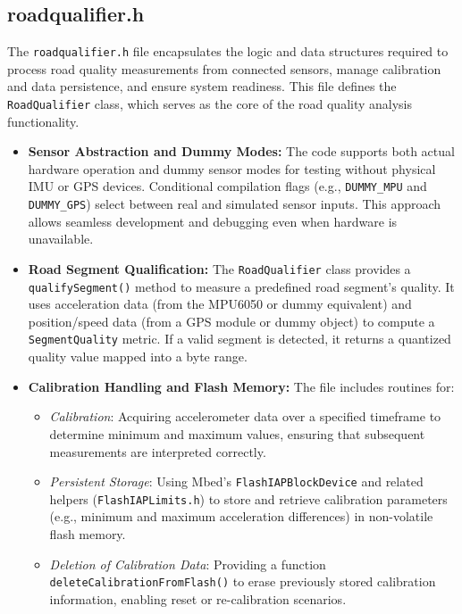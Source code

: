 \subsection{roadqualifier.h}

The \texttt{roadqualifier.h} file encapsulates the logic and data structures required to process road quality measurements from connected sensors, manage calibration and data persistence, and ensure system readiness. This file defines the \texttt{RoadQualifier} class, which serves as the core of the road quality analysis functionality.

\begin{itemize}
    \item \textbf{Sensor Abstraction and Dummy Modes:}  
    The code supports both actual hardware operation and dummy sensor modes for testing without physical IMU or GPS devices. Conditional compilation flags (e.g., \texttt{DUMMY\_MPU} and \texttt{DUMMY\_GPS}) select between real and simulated sensor inputs. This approach allows seamless development and debugging even when hardware is unavailable.

    \item \textbf{Road Segment Qualification:}  
    The \texttt{RoadQualifier} class provides a \texttt{qualifySegment()} method to measure a predefined road segment’s quality. It uses acceleration data (from the MPU6050 or dummy equivalent) and position/speed data (from a GPS module or dummy object) to compute a \texttt{SegmentQuality} metric. If a valid segment is detected, it returns a quantized quality value mapped into a byte range.

    \item \textbf{Calibration Handling and Flash Memory:}  
    The file includes routines for:
    \begin{itemize}
        \item \textit{Calibration}: Acquiring accelerometer data over a specified timeframe to determine minimum and maximum values, ensuring that subsequent measurements are interpreted correctly.
        \item \textit{Persistent Storage}: Using Mbed’s \texttt{FlashIAPBlockDevice} and related helpers (\texttt{FlashIAPLimits.h}) to store and retrieve calibration parameters (e.g., minimum and maximum acceleration differences) in non-volatile flash memory.
        \item \textit{Deletion of Calibration Data}: Providing a function \texttt{deleteCalibrationFromFlash()} to erase previously stored calibration information, enabling reset or re-calibration scenarios.
    \end{itemize}


\end{itemize}
